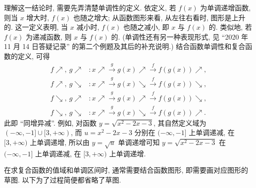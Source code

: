 理解这一结论时, 需要先弄清楚单调性的定义. 依定义, 若 $f(x)$ 为单调递增函数, 则当 $x$ 增大时, $f(x)$ 也随之增大; 从函数图形来看, 从左往右看时, 图形是上升的. 这一定义表明, 当 $x$ 减小时, $f(x)$ 也随之减小, 即 $x$ 与 $f(x)$ 的. 类似地, 若 $f(x)$ 为递减函数, 则 $x$ 与 $f(x)$ 的. (单调性还有另一种表现形式, 见 ``2020 年 11 月 14 日答疑记录'' 的第二个例题及其后的补充说明.) 结合函数单调性和复合函数的定义, 可得
\[\begin{aligned}
    f\nearrow,\ g\nearrow&\colon x\nearrow\xrightarrow{\ g\ } 
        g(x)\nearrow\xrightarrow{\ f\ } f(g(x))\nearrow,\\
    f\nearrow,\ g\searrow&\colon x\nearrow\xrightarrow{\ g\ } 
        g(x)\searrow\xrightarrow{\ f\ } f(g(x))\searrow,\\
    f\searrow,\ g\nearrow&\colon x\nearrow\xrightarrow{\ g\ } 
        g(x)\nearrow\xrightarrow{\ f\ } f(g(x))\searrow,\\
    f\searrow,\ g\searrow&\colon x\nearrow\xrightarrow{\ g\ } 
        g(x)\searrow\xrightarrow{\ f\ } f(g(x))\nearrow.
\end{aligned}\]
此即 ``同增异减''. 例如, 对函数 $y=\sqrt{x^2-2x-3}$, 其自然定义域为 $(-\infty,-1]\cup[3,+\infty)$, 而 $u=x^2-2x-3$ 分别在 $(-\infty,-1]$ 上单调递减, 在 $[3,+\infty)$ 上单调递增, 所以由 $y=\sqrt{u}$ 单调递增可知 $y=\sqrt{x^2-2x-3}$ 在 $(-\infty,-1]$ 上单调递减, 在 $[3,+\infty)$ 上单调递增.

在求复合函数的值域和单调区间时, 通常需要结合函数图形, 即需要画对应图形的草图. 以下为了过程简便都省略了草图.

